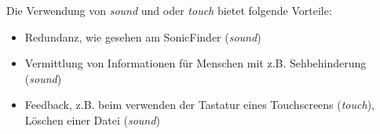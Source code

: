 Die Verwendung von \textit{sound} und oder \textit{touch} bietet folgende
Vorteile:

\begin{itemize}
  \item Redundanz, wie gesehen am SonicFinder (\textit{sound})  
  \item Vermittlung von Informationen für Menschen mit z.B. Sehbehinderung
    (\textit{sound})
  \item Feedback, z.B. beim verwenden der Tastatur eines Touchscreens (\textit{touch}),
    Löschen einer Datei (\textit{sound})
\end{itemize}


